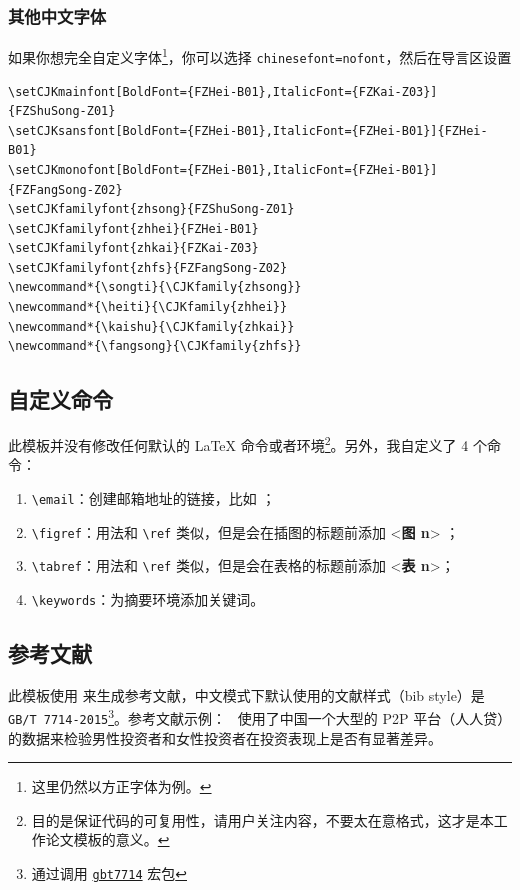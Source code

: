 \documentclass[lang=cn,11pt,a4paper,cite=authoryear]{elegantpaper}
\begin{document}
\begin{figure}[!htb]
\centering

\end{figure}

\subsubsection{其他中文字体}
如果你想完全自定义字体\footnote{这里仍然以方正字体为例。}，你可以选择 \lstinline{chinesefont=nofont}，然后在导言区设置
\begin{lstlisting}
\setCJKmainfont[BoldFont={FZHei-B01},ItalicFont={FZKai-Z03}]{FZShuSong-Z01}
\setCJKsansfont[BoldFont={FZHei-B01},ItalicFont={FZHei-B01}]{FZHei-B01}
\setCJKmonofont[BoldFont={FZHei-B01},ItalicFont={FZHei-B01}]{FZFangSong-Z02}
\setCJKfamilyfont{zhsong}{FZShuSong-Z01}
\setCJKfamilyfont{zhhei}{FZHei-B01}
\setCJKfamilyfont{zhkai}{FZKai-Z03}
\setCJKfamilyfont{zhfs}{FZFangSong-Z02}
\newcommand*{\songti}{\CJKfamily{zhsong}}
\newcommand*{\heiti}{\CJKfamily{zhhei}}
\newcommand*{\kaishu}{\CJKfamily{zhkai}}
\newcommand*{\fangsong}{\CJKfamily{zhfs}}
\end{lstlisting}


\subsection{自定义命令}
此模板并没有修改任何默认的 \LaTeX{} 命令或者环境\footnote{目的是保证代码的可复用性，请用户关注内容，不要太在意格式，这才是本工作论文模板的意义。}。另外，我自定义了 4 个命令：
\begin{enumerate}
  \item \lstinline{\email}：创建邮箱地址的链接，比如 ；
  \item \lstinline{\figref}：用法和 \lstinline{\ref} 类似，但是会在插图的标题前添加 <\textbf{图 n}> ；
  \item \lstinline{\tabref}：用法和 \lstinline{\ref} 类似，但是会在表格的标题前添加 <\textbf{表 n}>；
  \item \lstinline{\keywords}：为摘要环境添加关键词。
\end{enumerate}

\subsection{参考文献}
此模板使用  来生成参考文献，中文模式下默认使用的文献样式（bib style）是 \lstinline{GB/T 7714-2015}\footnote{通过调用 \href{https://ctan.org/pkg/gbt7714}{\lstinline{gbt7714}} 宏包}。参考文献示例：~\cite{en3} 使用了中国一个大型的 P2P 平台（人人贷）的数据来检验男性投资者和女性投资者在投资表现上是否有显著差异。
\end{document}

